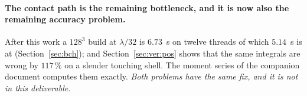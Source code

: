 \paragraph{The contact path is the remaining bottleneck, and it is now also the remaining
accuracy problem.} After this work a $128^3$ build at $\lambda/32$ is $6.73$~s on twelve
threads of which $5.14$~s is  at 
(Section~\ref{sec:bch}); and Section~\ref{sec:ver:pos} shows that the same integrals are
wrong by $117\,\%$ on a slender touching shell. The moment series of the companion document
computes them exactly. \emph{Both problems have the same fix, and it is not in this
deliverable.}
